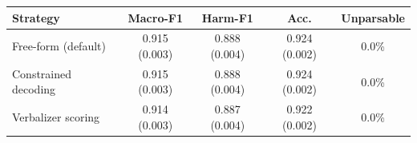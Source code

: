 \begin{tabular}{lcccc}
\toprule
Strategy & Macro-F1 & Harm-F1 & Acc. & Unparsable \\
\midrule
Free-form (default) & 0.915 (0.003) & 0.888 (0.004) & 0.924 (0.002) & 0.0\% \\
Constrained decoding & 0.915 (0.003) & 0.888 (0.004) & 0.924 (0.002) & 0.0\% \\
Verbalizer scoring & 0.914 (0.003) & 0.887 (0.004) & 0.922 (0.002) & 0.0\% \\
\bottomrule
\end{tabular}
